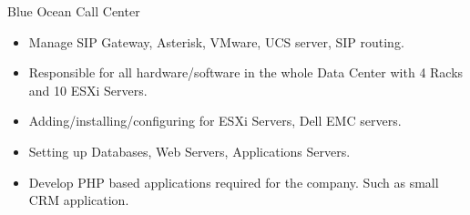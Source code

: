\documentclass[]{friggeri-cv}
\begin{document}
\begin{entrylist}
    {Blue Ocean Call Center}
    {
      \begin{itemize}
        \item Manage SIP Gateway, Asterisk, VMware, UCS server, SIP routing.
        \item Responsible for all hardware/software in the whole Data Center with 4 Racks and 10 ESXi Servers.
        \item Adding/installing/configuring for ESXi Servers, Dell EMC servers.
        \item Setting up Databases, Web Servers, Applications Servers.
        \item Develop PHP based applications required for the company. Such as small CRM application.
      \end{itemize}
      }
\end{entrylist}
\end{document}
